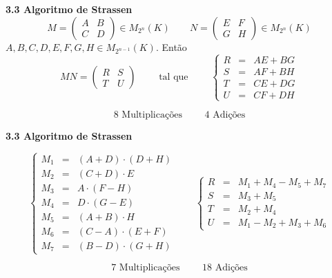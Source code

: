 \documentclass{beamer}
\begin{document}
\begin{frame}{\bf 3.3 Algoritmo de Strassen}
$$ M=\left(\begin{array}{cc} A & B \\ C & D \end{array}\right) \in M_{2^n}(K)\qquad 
N=\left(\begin{array}{cc} E & F \\ G & H \end{array}\right)\in M_{2^n}(K) $$
$A,B,C,D,E,F,G,H \in M_{2^{n-1}}(K)$. Então 
$$ MN=\left(\begin{array}{cc} R & S \\ T & U \end{array}\right) \qquad 
\mbox{ tal que } \qquad \left\{ \begin{array}{rcl} R & = & AE + BG \\
S & = & AF + BH \\
T & = & CE + DG \\
U & = & CF + DH  \end{array}\right.$$

$$ 8 \mbox{ Multiplicações } \qquad 4 \mbox{ Adições}$$
\end{frame}


\begin{frame}{\bf 3.3 Algoritmo de Strassen}

$$\left\{\begin{array}{rcl}
    M_{1} &=& (A + D)\cdot (D + H)\\
    M_{2} &=& (C + D)\cdot E\\
    M_{3} &=& A \cdot(F - H)\\
    M_{4} &=& D \cdot(G - E)\\
    M_{5} &=& (A + B)\cdot H\\
    M_{6} &=& (C - A) \cdot(E + F)\\
    M_{7} &=& (B - D) \cdot(G + H) 
    \end{array}\right. \qquad 
    \left\{ \begin{array}{rcl} 
    R & = & M_1 + M_4 - M_5 + M_7 \\
S & = & M_3 + M_5 \\
T & = & M_2+M_4 \\
U & = & M_1-M_2+M_3+M_6  \end{array}\right.$$

$$ 7 \mbox{ Multiplicações } \qquad 18 \mbox{ Adições}$$
\end{frame}
\end{document}
